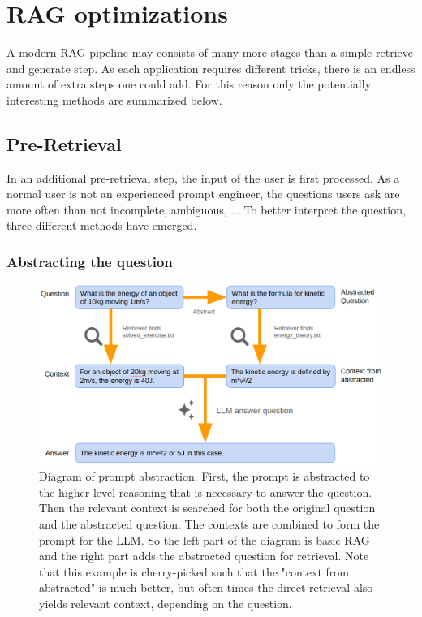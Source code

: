 \section{RAG optimizations}
A modern RAG pipeline may consists of many more stages than a simple retrieve and generate step. As each application requires different tricks, there is an endless amount of extra steps one could add. For this reason only the potentially interesting methods are summarized below.

\subsection{Pre-Retrieval}
In an additional pre-retrieval step, the input of the user is first processed. As a normal user is not an experienced prompt engineer, the questions users ask are more often than not incomplete, ambiguous, ... To better interpret the question, three different methods have emerged.

\subsubsection{Abstracting the question}

\begin{figure}[h]
	\centering
	\includegraphics[width=0.9\linewidth]{fig/rag_abstract_prompt.png}
	\caption{Diagram of prompt abstraction. First, the prompt is abstracted to the higher level reasoning that is necessary to answer the question. Then the relevant context is searched for both the original question and the abstracted question. The contexts are combined to form the prompt for the LLM. So the left part of the diagram is basic RAG and the right part adds the abstracted question for retrieval. Note that this example is cherry-picked such that the "context from abstracted" is much better, but often times the direct retrieval also yields relevant context, depending on the question.}
	\label{fig:rag_abstract_prompt}
\end{figure}

